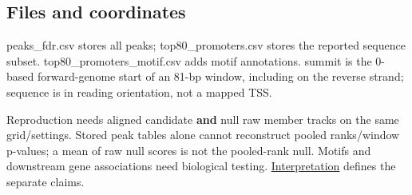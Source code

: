 \documentclass{article}
\begin{document}
\subsection{Files and coordinates}\label{files-and-coordinates}

peaks\_fdr.csv stores all peaks; top80\_\allowbreak{}promoters.csv stores the reported sequence subset. top80\_\allowbreak{}promoters\_\allowbreak{}motif.csv adds motif annotations. summit is the 0-based forward-genome start of an 81-bp window, including on the reverse strand; sequence is in reading orientation, not a mapped TSS.

Reproduction needs aligned candidate \textbf{and} null raw member tracks on the same grid/settings. Stored peak tables alone cannot reconstruct pooled ranks/window p-values; a mean of raw null scores is not the pooled-rank null. Motifs and downstream gene associations need biological testing. \href{../../../../../../docs/RESULTS.md\#interpreting-candidates-and-downstream-units}{Interpretation} defines the separate claims.
\end{document}
